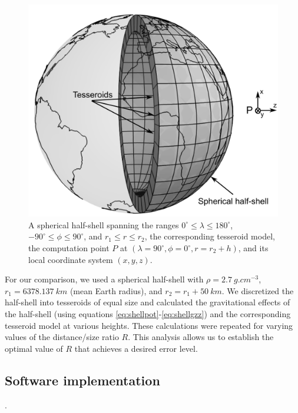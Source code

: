 \documentclass[paper,twocolumn,twoside]{geophysics}
\begin{document}
\begin{figure}
    \centering
    \includegraphics[width=\columnwidth]{figs/spherical-shell}
    \caption{A spherical half-shell
        spanning the ranges $0^{\circ} \le \lambda \le 180^\circ$,
        $-90^\circ \le \phi \le 90^\circ$,
        and $r_1 \le r \le r_2$,
        the corresponding tesseroid model,
        the computation point $P$
        at $(\lambda=90^\circ,\phi=0^\circ,r=r_2+h)$,
        and its local coordinate system $(x, y, z)$.
    }
    \label{fig:shell}
\end{figure}

For our comparison,
we used a spherical half-shell with
$\rho=2.7\ g.cm^{-3}$,
$r_1=6378.137\ km$ (mean Earth radius),
and
$r_2 = r_1 + 50\ km$.
We discretized the half-shell
into tesseroids of equal size
and calculated the gravitational effects of
the half-shell
(using equations \ref{eq:shellpot}-\ref{eq:shellgzz})
and the corresponding tesseroid model
at various heights.
These calculations were repeated
for varying values of
the distance/size ratio $R$.
This analysis
allows us to establish
the optimal value of $R$
that achieves a desired error level.

\subsection{Software implementation}

\citet{Barrera-Figueroa2006}.
\end{document}
